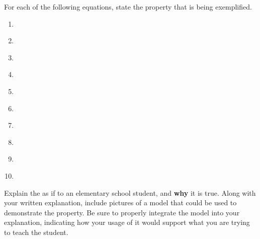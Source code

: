 
For each of the following equations, state the property that is being exemplified.\\

\begin{enumerate}
    \onehalfspacing

    \item {}\\

    \item {}\\

    \item {}\\

    \item {}\\

    \item {}\\

    \item {}\\

    \item {}\\

    \item {}\\

    \item {}\\

    \item {}\\
\end{enumerate}


\newpage
{}

Explain the \textbf{} as if to an elementary school student, and \textbf{why} it is true. Along with your written explanation, include pictures of a model that could be used to demonstrate the property. Be sure to properly integrate the model into your explanation, indicating how your usage of it would support what you are trying to teach the student.
